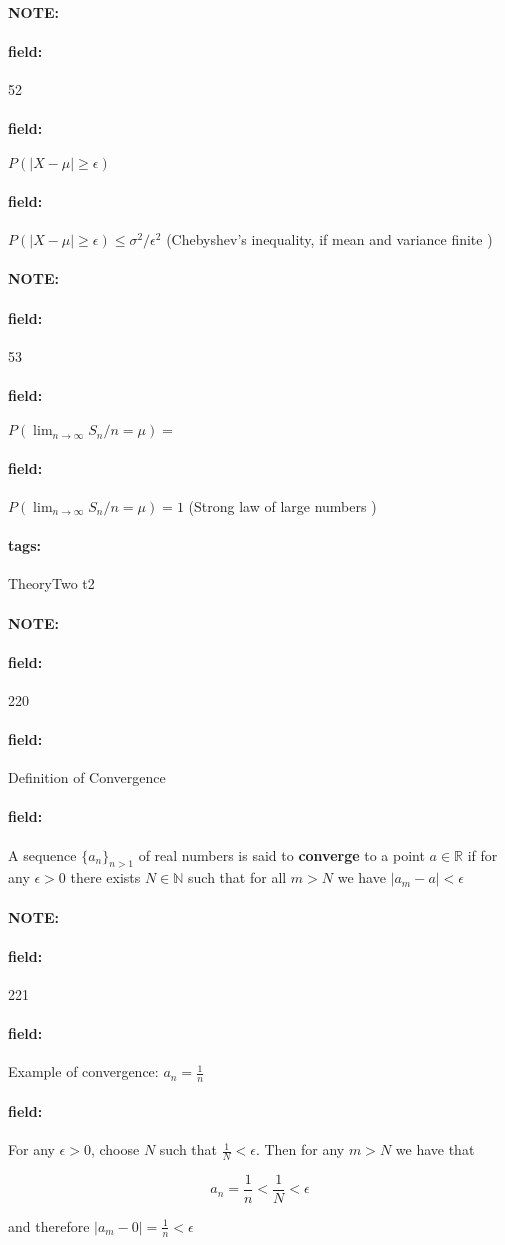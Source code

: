 \documentclass[12pt]{article}
\newenvironment{note}{\paragraph{NOTE:}}{}
\newenvironment{field}{\paragraph{field:}}{}
\newcommand*{\tags}[1]{\paragraph{tags: }#1}
\begin{document}
\begin{note}
  \begin{field}
    \tiny 52
  \end{field}
  \begin{field}
    $P(|X-\mu| \geq \epsilon)$
  \end{field}
  \begin{field}
    $P(|X-\mu| \geq \epsilon) \leq \sigma^2/\epsilon^2$ (Chebyshev's inequality, if mean and variance finite )
  \end{field}
\end{note}

\begin{note}
  \begin{field}
    \tiny 53
  \end{field}
  \begin{field}
    $P(\lim_{n\to \infty} S_n/n = \mu) = $
  \end{field}
  \begin{field}
  $P(\lim_{n\to \infty} S_n/n = \mu) = 1$ (Strong law of large numbers )
\end{field}
\end{note}

\tags{TheoryTwo t2}

\begin{note} \begin{field} \tiny 220 \end{field}
  \begin{field}
    Definition of Convergence
  \end{field}
  \begin{field}
    A sequence $\{a_n\}_{n > 1}$ of real numbers is said to \textbf{converge} to a point $a \in \mathbb{R}$ if for any $\epsilon > 0$ there exists $N \in \mathbb{N}$ such that for all $m > N $ we have $|a_m - a| < \epsilon $
  \end{field}
\end{note}

\begin{note} \begin{field} \tiny 221 \end{field}
  \begin{field}
    Example of convergence: $a_n = \frac{1}{n}$
  \end{field}
  \begin{field}
    For any $\epsilon > 0$, choose $N$ such that $\frac{1}{N} < \epsilon$. Then for any $m > N$ we have that

    $$a_n = \frac{1}{n} < \frac{1}{N} < \epsilon$$

    and therefore $|a_m - 0| = \frac{1}{n} < \epsilon$
  \end{field}
\end{note}
\end{document}
